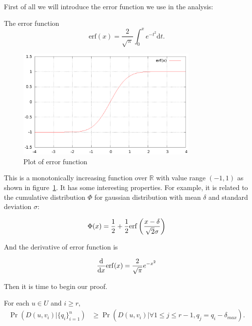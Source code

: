 First of all we will introduce the error function we use in the analysis:
\begin{definition}
The error function
\[\mathrm{erf}(x) = \frac{2}{\sqrt{\pi}} \int_{0}^{x} {e^{-t^2}} \mathrm{d} t.\]
\end{definition}

\begin{figure} \centering
\includegraphics[width=0.8\textwidth]{figures/erf.eps}
\caption{Plot of error function}
\label{fig:errorfunction}
\end{figure}

This is a monotonically increasing function over $\mathbb{R}$ with value range $(-1, 1)$
as shown in figure~\ref{fig:errorfunction}.
It has some interesting properties. For example, it is related to the cumulative distribution 
$\Phi$ for gaussian distribution with mean $\delta$ and standard deviation $\sigma$:

\[\Phi(x) = \frac{1}{2} + \frac{1}{2}\mathrm{erf} \left( \frac{x - \delta}{\sqrt{2} \sigma} \right) \]

And the derivative of error function is

\[\frac{\mathrm{d}}{\mathrm{d}x}\mathrm{erf}(x) = \frac{2}{\sqrt{\pi}} e^{-x^2}\]

Then it is time to begin our proof.

\begin{proposition} \label{proposition1}
    For each $u \in U$ and $i \ge r$,
    \begin{align*}
    \Pr(D(u, v_i) | \{q_i\}_{i=1}^n) &\ge \Pr(D(u, v_i) | \forall 1 \le j \le r-1, q_j = q_i - \delta_{max}).
    \end{align*}
\end{proposition}

